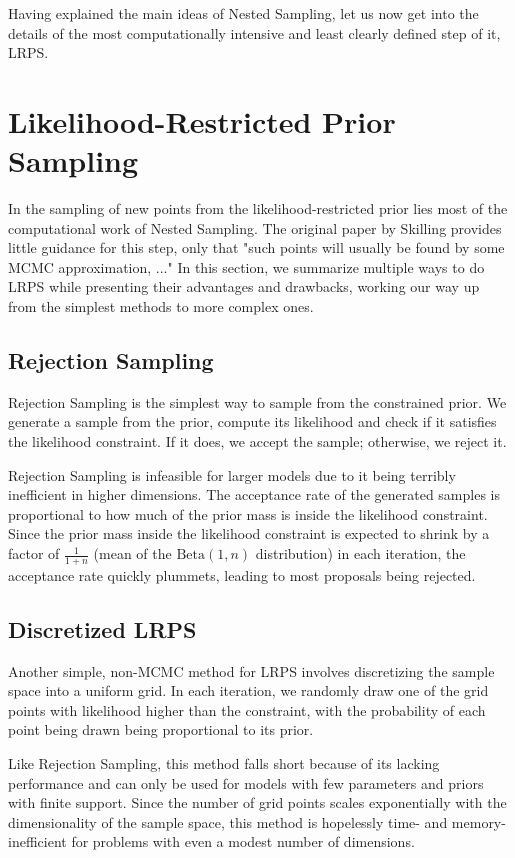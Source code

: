 \documentclass[12pt, a4paper]{report}
\begin{document}
Having explained the main ideas of Nested Sampling, let us now get into the details of the most computationally intensive and least clearly defined step of it, LRPS.

\FloatBarrier
\section{Likelihood-Restricted Prior Sampling}
In the sampling of new points from the likelihood-restricted prior lies most of the computational work of Nested Sampling.
The original paper by Skilling provides little guidance for this step, only that "such points will usually be found by some MCMC approximation, ..." \cite[6]{skilling}
In this section, we summarize multiple ways to do LRPS while presenting their advantages and drawbacks, working our way up from the simplest methods to more complex ones.

\subsection{Rejection Sampling}
Rejection Sampling is the simplest way to sample from the constrained prior.
We generate a sample from the prior, compute its likelihood and check if it satisfies the likelihood constraint.
If it does, we accept the sample; otherwise, we reject it.

Rejection Sampling is infeasible for larger models due to it being terribly inefficient in higher dimensions.
The acceptance rate of the generated samples is proportional to how much of the prior mass is inside the likelihood constraint.
Since the prior mass inside the likelihood constraint is expected to shrink by a factor of $\frac{1}{1+n}$ (mean of the $\textrm{Beta}(1, n)$ distribution) in each iteration, the acceptance rate quickly plummets, leading to most proposals being rejected.

\subsection{Discretized LRPS}
Another simple, non-MCMC method for LRPS involves discretizing the sample space into a uniform grid.
In each iteration, we randomly draw one of the grid points with likelihood higher than the constraint, with the probability of each point being drawn being proportional to its prior.

Like Rejection Sampling, this method falls short because of its lacking performance and can only be used for models with few parameters and priors with finite support.
Since the number of grid points scales exponentially with the dimensionality of the sample space, this method is hopelessly time- and memory-inefficient for problems with even a modest number of dimensions.
\end{document}
